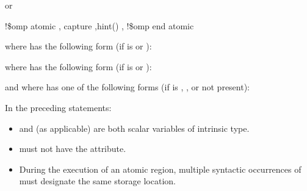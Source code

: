 \begin{fortranspecific}
or

\begin{boxedcode}
!\$omp atomic \plc{[memory-order-clause[},\plc{]]} capture \plc{[[},\plc{]}hint()\plc{]} 
           \plc{[[},\plc{]memory-order-clause]}
!\$omp end atomic
\end{boxedcode}

where  has the following form (if  
is  or ):

\begin{quote}
\end{quote}

where  has the following form (if  
is  or ):

\begin{quote}
\end{quote}

\begin{figure}[t!]
\end{figure}
and where  has one of the following forms (if  is , 
, or not present):

\begin{quote}



\end{quote}

In the preceding statements:

\begin{itemize}
\item {} and  (as applicable) are both scalar variables of intrinsic type.

\item {} must not have the  attribute.

\item During the execution of an atomic region, multiple syntactic occurrences of  must 
designate the same storage location.


\end{itemize}
\end{fortranspecific}
